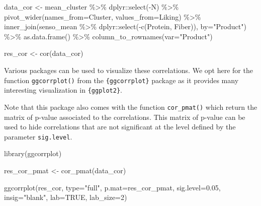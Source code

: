 \documentclass[
]{book}
\newenvironment{Shaded}{\begin{snugshade}}{\end{snugshade}}
\newcommand{\AttributeTok}[1]{\textcolor[rgb]{0.77,0.63,0.00}{#1}}
\newcommand{\ConstantTok}[1]{\textcolor[rgb]{0.00,0.00,0.00}{#1}}
\newcommand{\DecValTok}[1]{\textcolor[rgb]{0.00,0.00,0.81}{#1}}
\newcommand{\FloatTok}[1]{\textcolor[rgb]{0.00,0.00,0.81}{#1}}
\newcommand{\FunctionTok}[1]{\textcolor[rgb]{0.00,0.00,0.00}{#1}}
\newcommand{\NormalTok}[1]{#1}
\newcommand{\OtherTok}[1]{\textcolor[rgb]{0.56,0.35,0.01}{#1}}
\newcommand{\SpecialCharTok}[1]{\textcolor[rgb]{0.00,0.00,0.00}{#1}}
\newcommand{\StringTok}[1]{\textcolor[rgb]{0.31,0.60,0.02}{#1}}
\begin{document}
\begin{Shaded}
\begin{Highlighting}[]
\NormalTok{data\_cor }\OtherTok{\textless{}{-}}\NormalTok{ mean\_cluster }\SpecialCharTok{\%\textgreater{}\%} 
\NormalTok{  dplyr}\SpecialCharTok{::}\FunctionTok{select}\NormalTok{(}\SpecialCharTok{{-}}\NormalTok{N) }\SpecialCharTok{\%\textgreater{}\%} 
  \FunctionTok{pivot\_wider}\NormalTok{(}\AttributeTok{names\_from=}\NormalTok{Cluster, }\AttributeTok{values\_from=}\NormalTok{Liking) }\SpecialCharTok{\%\textgreater{}\%} 
  \FunctionTok{inner\_join}\NormalTok{(senso\_mean }\SpecialCharTok{\%\textgreater{}\%}\NormalTok{ dplyr}\SpecialCharTok{::}\FunctionTok{select}\NormalTok{(}\SpecialCharTok{{-}}\FunctionTok{c}\NormalTok{(Protein, Fiber)), }\AttributeTok{by=}\StringTok{"Product"}\NormalTok{) }\SpecialCharTok{\%\textgreater{}\%} 
  \FunctionTok{as.data.frame}\NormalTok{() }\SpecialCharTok{\%\textgreater{}\%} 
  \FunctionTok{column\_to\_rownames}\NormalTok{(}\AttributeTok{var=}\StringTok{"Product"}\NormalTok{)}

\NormalTok{res\_cor }\OtherTok{\textless{}{-}} \FunctionTok{cor}\NormalTok{(data\_cor)}
\end{Highlighting}
\end{Shaded}

Various packages can be used to visualize these correlations. We opt here for the function \texttt{ggcorrplot()} from the \texttt{\{ggcorrplot\}} package as it provides many interesting visualization in \texttt{\{ggplot2\}}.

Note that this package also comes with the function \texttt{cor\_pmat()} which return the matrix of p-value associated to the correlations. This matrix of p-value can be used to hide correlations that are not significant at the level defined by the parameter \texttt{sig.level}.

\begin{Shaded}
\begin{Highlighting}[]
\FunctionTok{library}\NormalTok{(ggcorrplot)}

\NormalTok{res\_cor\_pmat }\OtherTok{\textless{}{-}} \FunctionTok{cor\_pmat}\NormalTok{(data\_cor)}

\FunctionTok{ggcorrplot}\NormalTok{(res\_cor, }\AttributeTok{type=}\StringTok{"full"}\NormalTok{, }\AttributeTok{p.mat=}\NormalTok{res\_cor\_pmat, }\AttributeTok{sig.level=}\FloatTok{0.05}\NormalTok{, }\AttributeTok{insig=}\StringTok{"blank"}\NormalTok{, }\AttributeTok{lab=}\ConstantTok{TRUE}\NormalTok{, }\AttributeTok{lab\_size=}\DecValTok{2}\NormalTok{)}
\end{Highlighting}
\end{Shaded}
\end{document}
